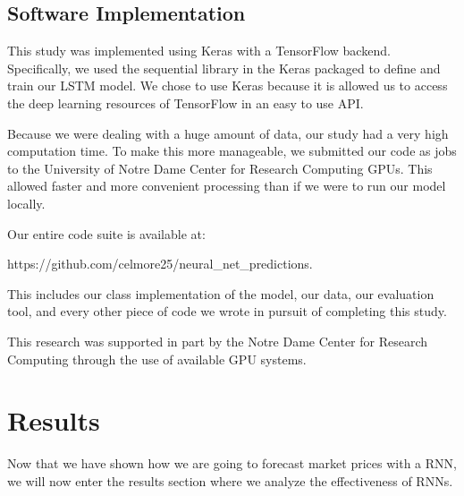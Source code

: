 \documentclass[sigconf]{acmart}
\begin{document}
\subsection{Software Implementation}
This study was implemented using Keras with a TensorFlow backend. Specifically, we used the sequential library in the Keras packaged to define and train our LSTM model. We chose to use Keras because it is allowed us to access the deep learning resources of TensorFlow in an easy to use API. 

Because we were dealing with a huge amount of data, our study had a very high computation time. To make this more manageable, we submitted our code as jobs to the University of Notre Dame Center for Research Computing GPUs. This allowed faster and more convenient processing than if we were to run our model locally. 

Our entire code suite  is available at:

https://github.com/celmore25/neural_net_predictions.

This includes our class implementation of the model, our data, our evaluation tool, and every other piece of code we wrote in pursuit of completing this study. 

This research was supported in part by the Notre Dame Center for Research Computing through the use of available GPU systems. 



\section{Results}

Now that we have shown how we are going to forecast market prices with a RNN, we will now enter the results section where we analyze the effectiveness of RNNs. 

\label{sec:results}

\end{document}
